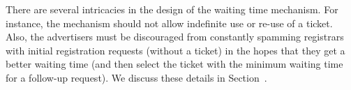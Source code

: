 There are several intricacies in the design of the waiting time mechanism. For instance, the mechanism should not allow indefinite use or re-use of a ticket. Also, the advertisers must be discouraged from constantly spamming registrars with initial registration requests (without a ticket) in the hopes that they get a better waiting time (and then select the ticket with the minimum waiting time for a follow-up request). We discuss these details in Section~. 




